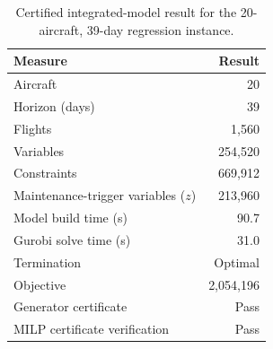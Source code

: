 \begin{table}[htbp]
\centering\small
\caption{Certified integrated-model result for the 20-aircraft, 39-day regression instance.}
\label{tab:strength_p20_h39}
\begin{tabular}{lr}
\toprule
Measure & Result \\
\midrule
Aircraft & 20 \\
Horizon (days) & 39 \\
Flights & 1,560 \\
Variables & 254,520 \\
Constraints & 669,912 \\
Maintenance-trigger variables ($z$) & 213,960 \\
Model build time (s) & 90.7 \\
Gurobi solve time (s) & 31.0 \\
Termination & Optimal \\
Objective & 2,054,196 \\
Generator certificate & Pass \\
MILP certificate verification & Pass \\
\bottomrule
\end{tabular}
\end{table}
